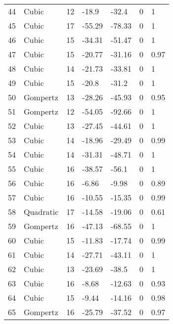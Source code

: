 \documentclass[11pt]{article}
\begin{document}
\begin{center}
\begin{longtable}{lllllll}
        44  & Cubic     & 12              & -18.9   & -32.4   & 0       & 1    \\
        45  & Cubic     & 17              & -55.29  & -78.33  & 0       & 1    \\
        46  & Cubic     & 15              & -34.31  & -51.47  & 0       & 1    \\
        47  & Cubic     & 15              & -20.77  & -31.16  & 0       & 0.97 \\
        48  & Cubic     & 14              & -21.73  & -33.81  & 0       & 1    \\
        49  & Cubic     & 15              & -20.8   & -31.2   & 0       & 1    \\
        50  & Gompertz  & 13              & -28.26  & -45.93  & 0       & 0.95 \\
        51  & Gompertz  & 12              & -54.05  & -92.66  & 0       & 1    \\
        52  & Cubic     & 13              & -27.45  & -44.61  & 0       & 1    \\
        53  & Cubic     & 14              & -18.96  & -29.49  & 0       & 0.99 \\
        54  & Cubic     & 14              & -31.31  & -48.71  & 0       & 1    \\
        55  & Cubic     & 16              & -38.57  & -56.1   & 0       & 1    \\
        56  & Cubic     & 16              & -6.86   & -9.98   & 0       & 0.89 \\
        57  & Cubic     & 16              & -10.55  & -15.35  & 0       & 0.99 \\
        58  & Quadratic & 17              & -14.58  & -19.06  & 0       & 0.61 \\
        59  & Gompertz  & 16              & -47.13  & -68.55  & 0       & 1    \\
        60  & Cubic     & 15              & -11.83  & -17.74  & 0       & 0.99 \\
        61  & Cubic     & 14              & -27.71  & -43.11  & 0       & 1    \\
        62  & Cubic     & 13              & -23.69  & -38.5   & 0       & 1    \\
        63  & Cubic     & 16              & -8.68   & -12.63  & 0       & 0.93 \\
        64  & Cubic     & 15              & -9.44   & -14.16  & 0       & 0.98 \\
        65  & Gompertz  & 16              & -25.79  & -37.52  & 0       & 0.97 \\

\end{longtable}
\end{center}
\end{document}
